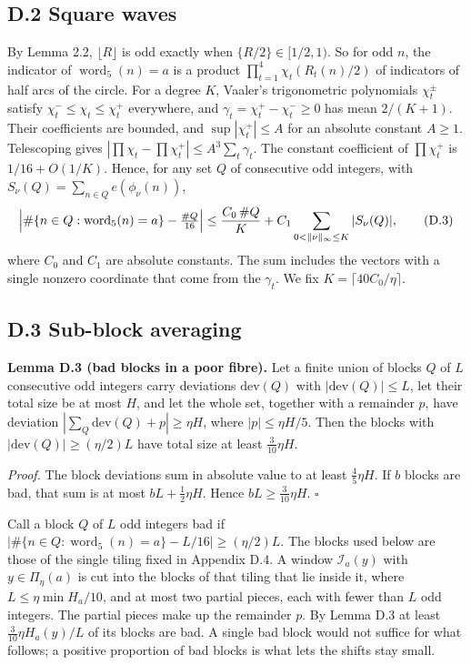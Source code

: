 \documentclass[11pt,a4paper]{article}
\begin{document}
\subsection{D.2 Square waves}\label{d.2-square-waves}

By Lemma 2.2, \(\lfloor R\rfloor\) is odd exactly when
\(\{R/2\}\in[1/2,1)\). So for odd \(n\), the indicator of
\(\operatorname{word}_5(n)=a\) is a product
\(\prod_{t=1}^4\chi_t(R_t(n)/2)\) of indicators of half arcs of the
circle. For a degree \(K\), Vaaler's trigonometric polynomials
\(\chi_t^\pm\) satisfy \(\chi_t^-\le\chi_t\le\chi_t^+\) everywhere, and
\(\gamma_t=\chi_t^+-\chi_t^-\ge0\) has mean \(2/(K+1)\). Their
coefficients are bounded, and \(\sup|\chi_t^+|\le A\) for an absolute
constant \(A\ge1\). Telescoping gives
\(|\prod\chi_t-\prod\chi_t^+|\le A^3\sum_t\gamma_t\). The constant
coefficient of \(\prod\chi_t^+\) is \(1/16+O(1/K)\). Hence, for any set
\(Q\) of consecutive odd integers, with
\(S_\nu(Q)=\sum_{n\in Q}e(\phi_\nu(n))\), \[
\Bigl|\#\{n\in Q:\operatorname{word}_5(n)=a\}-\tfrac{\#Q}{16}\Bigr|
\le\frac{C_0\,\#Q}{K}+C_1\sum_{0<\|\nu\|_\infty\le K}|S_\nu(Q)|,
\tag{D.3}
\] where \(C_0\) and \(C_1\) are absolute constants. The sum includes
the vectors with a single nonzero coordinate that come from the
\(\gamma_t\). We fix \(K=\lceil40C_0/\eta\rceil\).


\subsection{D.3 Sub-block averaging}\label{d.3-sub-block-averaging}

\textbf{Lemma D.3 (bad blocks in a poor fibre).} Let a finite union of
blocks \(Q\) of \(L\) consecutive odd integers carry deviations
\(\mathrm{dev}(Q)\) with \(|\mathrm{dev}(Q)|\le L\), let their total
size be at most \(H\), and let the whole set, together with a remainder
\(p\), have deviation \(|\sum_Q\mathrm{dev}(Q)+p|\ge\eta H\), where
\(|p|\le\eta H/5\). Then the blocks with
\(|\mathrm{dev}(Q)|\ge(\eta/2)L\) have total size at least
\(\tfrac3{10}\eta H\).

\emph{Proof.} The block deviations sum in absolute value to at least
\(\tfrac45\eta H\). If \(b\) blocks are bad, that sum is at most
\(bL+\tfrac12\eta H\). Hence \(bL\ge\tfrac3{10}\eta H\). \(\square\)

Call a block \(Q\) of \(L\) odd integers bad if
\(|\#\{n\in Q:\operatorname{word}_5(n)=a\}-L/16|\ge(\eta/2)L\). The
blocks used below are those of the single tiling fixed in Appendix D.4.
A window \(\mathcal I_a(y)\) with \(y\in\Pi_\eta(a)\) is cut into the
blocks of that tiling that lie inside it, where \(L\le\eta\min H_a/10\),
and at most two partial pieces, each with fewer than \(L\) odd integers.
The partial pieces make up the remainder \(p\). By Lemma D.3 at least
\(\tfrac3{10}\eta H_a(y)/L\) of its blocks are bad. A single bad block
would not suffice for what follows; a positive proportion of bad blocks
is what lets the shifts stay small.
\end{document}
